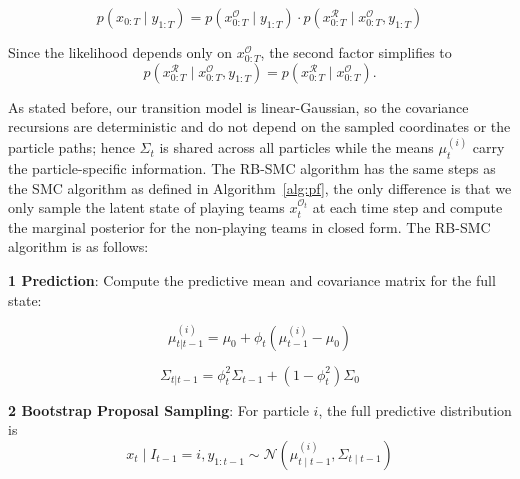 


\begin{equation}
    p(x_{0:T} \mid y_{1:T}) = p(x_{0:T}^{\mathcal{O}} \mid y_{1:T}) \cdot p(x_{0:T}^{\mathcal{R}} \mid x_{0:T}^{\mathcal{O}}, y_{1:T})
\end{equation}

Since the likelihood depends only on $x_{0:T}^{\mathcal{O}}$, the second factor simplifies to
\begin{equation}
    p(x_{0:T}^{\mathcal{R}} \mid x_{0:T}^{\mathcal{O}}, y_{1:T}) = p(x_{0:T}^{\mathcal{R}} \mid x_{0:T}^{\mathcal{O}}).
\end{equation}

As stated before, our transition model is linear-Gaussian, so the covariance recursions are deterministic and do not depend on the sampled coordinates or the particle paths; hence $\Sigma_t$ is shared across all particles while the means $\mu_t^{(i)}$ carry the particle-specific information. The RB-SMC algorithm has the same steps as the SMC algorithm as defined in Algorithm~\ref{alg:pf}, the only difference is that we only sample the latent state of playing teams $x_t^{\mathcal{O}_t}$ at each time step and compute the marginal posterior for the non-playing teams in closed form. The RB-SMC algorithm is as follows:

\textbf{1 Prediction}: Compute the predictive mean and covariance matrix for the full state:

\begin{equation}
    \mu_{t|t-1}^{(i)} = \mu_0 + \phi_t (\mu_{t-1}^{(i)} - \mu_0) \nonumber
\end{equation}

\begin{equation}
    \Sigma_{t|t-1} = \phi_t^2 \Sigma_{t-1} + (1 - \phi_t^2) \Sigma_0 \nonumber
\end{equation}

\textbf{2 Bootstrap Proposal Sampling}: For particle $i$, the full predictive distribution is
\begin{equation}
x_t \mid I_{t-1}=i,y_{1:t-1} \sim \mathcal{N}\left(\mu_{t\mid t-1}^{(i)}, \Sigma_{t\mid t-1} \right) \end{equation}

